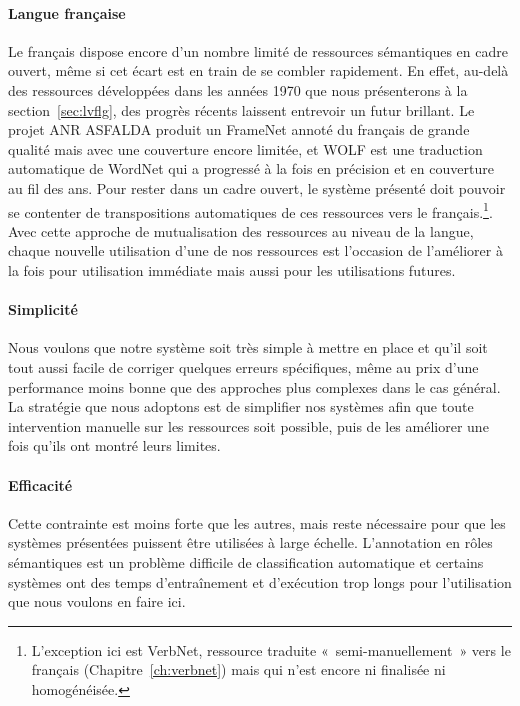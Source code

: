 \paragraph{Langue française} Le français dispose encore d'un nombre limité de
ressources sémantiques en cadre ouvert, même si cet écart est en train de se
combler rapidement. En effet, au-delà des ressources développées dans les
années 1970 que nous présenterons à la section~\ref{sec:lvflg}, des progrès
récents laissent entrevoir un futur brillant. Le projet ANR ASFALDA
\citep{candito2014developing} produit un FrameNet annoté du français de grande
qualité mais avec une couverture encore limitée, et WOLF
\citep{sagot2008building} est une traduction automatique de WordNet
\citep{fellbaum1998wordnet} qui a progressé à la fois en précision et en
couverture au fil des ans. Pour rester dans un cadre ouvert, le système
présenté doit pouvoir se contenter de transpositions automatiques de ces
ressources vers le français.\footnote{L'exception ici est VerbNet, ressource
traduite «~semi-manuellement~» vers le français (Chapitre~\ref{ch:verbnet})
mais qui n'est encore ni finalisée ni homogénéisée.}. Avec cette approche de
mutualisation des ressources au niveau de la langue, chaque nouvelle
utilisation d'une de nos ressources est l'occasion de l'améliorer à la fois
pour utilisation immédiate mais aussi pour les utilisations futures.

\paragraph{Simplicité} Nous voulons que notre système soit très simple à mettre
en place et qu'il soit tout aussi facile de corriger quelques erreurs
spécifiques, même au prix d'une performance moins bonne que des approches plus
complexes dans le cas général. La stratégie que nous adoptons est de simplifier
nos systèmes afin que toute intervention manuelle sur les ressources soit
possible, puis de les améliorer une fois qu'ils ont montré leurs limites.

\paragraph{Efficacité} Cette contrainte est moins forte que les autres, mais
reste nécessaire pour que les systèmes présentées puissent être utilisées à
large échelle. L'annotation en rôles sémantiques est un problème difficile de
classification automatique et certains systèmes ont des temps d'entraînement et
d'exécution trop longs pour l'utilisation que nous voulons en faire ici.

